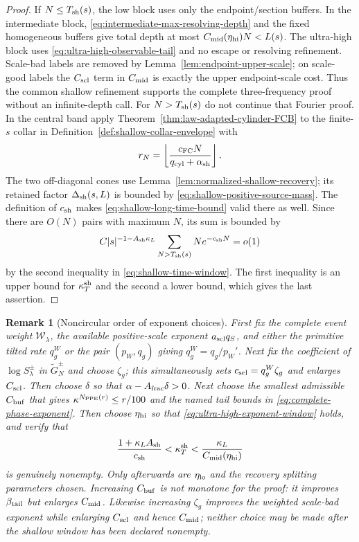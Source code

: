 \documentclass[11pt]{article}
\newtheorem{remark}[theorem]{Remark}
\begin{document}
\begin{proof}
If $N\le T_{\rm sh}(s)$, the low block uses only the endpoint/section
buffers.  In the intermediate block, \eqref{eq:intermediate-max-resolving-depth}
and the fixed homogeneous buffers give total depth at most
$C_{\rm mid}(\eta_{\rm hi})N<L(s)$.  The ultra-high block uses
\eqref{eq:ultra-high-observable-tail} and no escape or resolving refinement.
Scale-bad labels are removed by Lemma~\ref{lem:endpoint-upper-scale}; on
scale-good labels the $C_{\rm scl}$ term in $C_{\rm mid}$ is exactly the
upper endpoint-scale cost.  Thus the common shallow refinement supports the complete three-frequency
proof without an infinite-depth call.  For $N>T_{\rm sh}(s)$ do not continue
that Fourier proof.  In the central band apply
Theorem~\ref{thm:law-adapted-cylinder-FCB} to the finite-$s$ collar in
Definition~\ref{def:shallow-collar-envelope} with
\[
 r_N=\left\lfloor\frac{c_{\rm FC}N}
 {q_{\rm cyl}+\alpha_{\rm sh}}\right\rfloor .
\]
The two off-diagonal cones use
Lemma~\ref{lem:normalized-shallow-recovery}; its retained factor
$\Delta_{\rm sh}(s,L)$ is bounded by
\eqref{eq:shallow-positive-source-mass}.  The definition of $c_{\rm sh}$ makes
\eqref{eq:shallow-long-time-bound} valid there as well.  Since there are $O(N)$ pairs
with maximum $N$, its sum is bounded by
\[
 C|s|^{-1-A_{\rm sh}\kappa_L}
 \sum_{N>T_{\rm sh}(s)}Ne^{-c_{\rm sh}N}=o(1)
\]
by the second inequality in \eqref{eq:shallow-time-window}.  The first
inequality is an upper bound for $\kappa_T^{\rm sh}$ and the second a lower
bound, which gives the last assertion.
\end{proof}

\begin{remark}[Noncircular order of exponent choices]
\label{rem:parameter-selection-order}
First fix the complete event weight $\mathscr W_\lambda$, the available
positive-scale exponent $a_{\rm scl}q_S$, and either the primitive tilted
rate $q_g^W$ or the pair $(p_W,q_g)$ giving
$q_g^W=q_g/p_W'$.  Next fix the coefficient of $\log S_\lambda^\pm$ in
$\widetilde G_N^\pm$ and choose $\zeta_g$; this simultaneously sets
$c_{\rm scl}=q_g^W\zeta_g$ and enlarges $C_{\rm scl}$.  Then choose $\delta$
so that $\alpha-A_{\rm frac}\delta>0$.  Next choose
the smallest admissible $C_{\rm buf}$ that gives
$\kappa^{N_{\rm PPE}(r)}\le r/100$ and the named tail bounds in
\eqref{eq:complete-phase-exponent}.  Then choose $\eta_{\rm hi}$ so that
\eqref{eq:ultra-high-exponent-window} holds, and verify that
\[
 \frac{1+\kappa_LA_{\rm sh}}{c_{\rm sh}}
 <\kappa_T^{\rm sh}<
 \frac{\kappa_L}{C_{\rm mid}(\eta_{\rm hi})}
\]
is genuinely nonempty.  Only afterwards are $\eta_{\rm lo}$ and the recovery
splitting parameters chosen.  Increasing $C_{\rm buf}$ is not monotone for
the proof: it improves $\beta_{\rm tail}$ but enlarges $C_{\rm mid}$.
Likewise increasing $\zeta_g$ improves the weighted scale-bad exponent while
enlarging $C_{\rm scl}$ and hence $C_{\rm mid}$; neither choice may be made
after the shallow window has been declared nonempty.
\end{remark}
\end{document}

